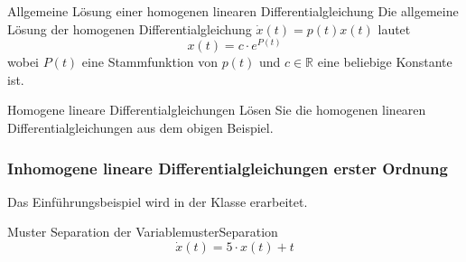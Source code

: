 \vspace{4cm}

\begin{satz}{Allgemeine Lösung einer homogenen linearen Differentialgleichung}{}
    Die allgemeine Lösung der homogenen Differentialgleichung
    \(\dot{x}(t)=p(t)x(t)\) lautet
    \[
        x(t)=c\cdot e^{P(t)}
    \]
    wobei \(P(t)\) eine Stammfunktion von \(p(t)\)
    und \(c\in\mathbb{R}\) eine beliebige Konstante ist.
\end{satz}

\begin{ueb}{Homogene lineare Differentialgleichungen}{}
    Lösen Sie die homogenen linearen Differentialgleichungen
    aus dem obigen Beispiel.
\end{ueb}














\clearpage

\subsubsection{Inhomogene lineare Differentialgleichungen erster Ordnung}

Das Einführungsbeispiel wird in der Klasse erarbeitet.
\begin{bsp}
    {Muster Separation der Variable}{musterSeparation}
    \[\dot{x}(t) = 5\cdot x(t) + t \]
    \pagebreak
\end{bsp}


